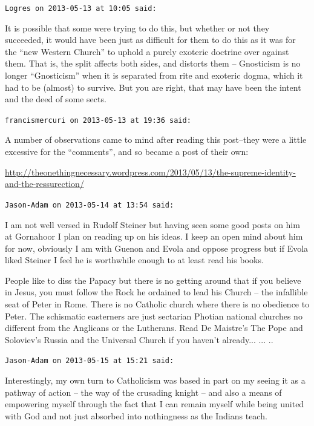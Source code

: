 \begin{footnotesize}
\begin{sffamily}
\hfill

\texttt{Logres on 2013-05-13 at 10:05 said:}

It is possible that some were trying to do this, but whether or not they succeeded, it would have been just as difficult for them to do this as it was for the ``new Western Church'' to uphold a purely exoteric doctrine over against them. That is, the split affects both sides, and distorts them -- Gnosticism is no longer ``Gnosticism'' when it is separated from rite and exoteric dogma, which it had to be (almost) to survive. But you are right, that may have been the intent and the deed of some sects.

\hfill

\texttt{francismercuri on 2013-05-13 at 19:36 said:}

A number of observations came to mind after reading this post--they were a little excessive for the ``comments'', and so became a post of their own:

\url{http://theonethingnecessary.wordpress.com/2013/05/13/the-supreme-identity-and-the-ressurection/}


\hfill

\texttt{Jason-Adam on 2013-05-14 at 13:54 said:}

I am not well versed in Rudolf Steiner but having seen some good posts on him at Gornahoor I plan on reading up on his ideas. I keep an open mind about him for now, obviously I am with Guenon and Evola and oppose progress but if Evola liked Steiner I feel he is worthwhile enough to at least read his books.

People like to diss the Papacy but there is no getting around that if you believe in Jesus, you must follow the Rock he ordained to lead his Church -- the infallible seat of Peter in Rome. There is no Catholic church where there is no obedience to Peter. The schismatic easterners are just sectarian Photian national churches no different from the Anglicans or the Lutherans. Read De Maistre's The Pope and Soloviev's Russia and the Universal Church if you haven't already... ... ..

\texttt{Jason-Adam on 2013-05-15 at 15:21 said:}

Interestingly, my own turn to Catholicism was based in part on my seeing it as a pathway of action -- the way of the crusading knight -- and also a means of empowering myself through the fact that I can remain myself while being united with God and not just absorbed into nothingness as the Indians teach.


\end{sffamily}
\end{footnotesize}
